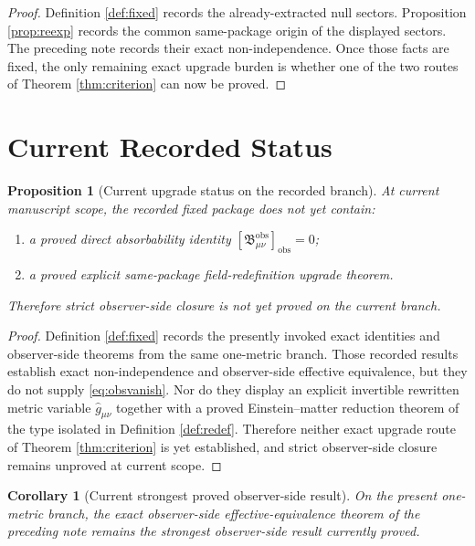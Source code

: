 \documentclass[11pt]{article}
\newcommand{\ObsBurden}{\mathfrak B_{\mu\nu}^{\mathrm{obs}}}
\newcommand{\ObserverClass}[1]{\left[#1\right]_{\mathrm{obs}}}
\newcommand{\RedefMetric}{\widehat g}
\newtheorem{proposition}{Proposition}
\newtheorem{corollary}{Corollary}
\begin{document}
\begin{proof}
Definition \ref{def:fixed} records the already-extracted null sectors. Proposition \ref{prop:reexp} records the common same-package origin of the displayed sectors. The preceding note records their exact non-independence. Once those facts are fixed, the only remaining exact upgrade burden is whether one of the two routes of Theorem \ref{thm:criterion} can now be proved.
\end{proof}

\section{Current Recorded Status}

\begin{proposition}[Current upgrade status on the recorded branch]
\label{prop:status}
At current manuscript scope, the recorded fixed package does \emph{not yet} contain:
\begin{enumerate}
    \item a proved direct absorbability identity \(\ObserverClass{\ObsBurden}=0\);
    \item a proved explicit same-package field-redefinition upgrade theorem.
\end{enumerate}
Therefore strict observer-side closure is not yet proved on the current branch.
\end{proposition}

\begin{proof}
Definition \ref{def:fixed} records the presently invoked exact identities and observer-side theorems from the same one-metric branch. Those recorded results establish exact non-independence and observer-side effective equivalence, but they do not supply \eqref{eq:obsvanish}. Nor do they display an explicit invertible rewritten metric variable \(\RedefMetric_{\mu\nu}\) together with a proved Einstein--matter reduction theorem of the type isolated in Definition \ref{def:redef}. Therefore neither exact upgrade route of Theorem \ref{thm:criterion} is yet established, and strict observer-side closure remains unproved at current scope.
\end{proof}

\begin{corollary}[Current strongest proved observer-side result]
\label{cor:strongest}
On the present one-metric branch, the exact observer-side effective-equivalence theorem of the preceding note remains the strongest observer-side result currently proved.
\end{corollary}
\end{document}
